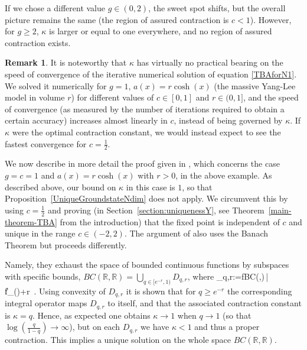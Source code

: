 \documentclass[12pt]{article}
\theoremstyle{plain}
\theoremstyle{definition}
\newtheorem{remark}[theorem]{Remark}
\numberwithin{equation}{section}
\numberwithin{theorem}{section}
\def\be#1\ee{\begin{equation}#1\end{equation}}
\begin{document}
If we chose a different value $g\in(0,2)$, the sweet spot shifts, but the overall picture remains the same (the region of assured contraction is $c<1$). However, for $g\geq 2$, $\kappa$ is larger or equal to one everywhere, and no region of assured contraction exists.

\begin{remark}\label{kappa-is-not-optimal}
It is noteworthy that $\kappa$ has virtually no practical bearing on the speed of convergence of the iterative numerical solution of equation \eqref{TBAforN1}. We solved it numerically for $g=1$, $a(x)=r\cosh(x)$ (the massive Yang-Lee model in volume $r$) for different values of $c\in[0,1]$ and $r\in(0,1]$, and the speed of convergence
(as measured by the number of iterations required to obtain a certain accuracy) increases almost linearly in $c$, instead of being governed by $\kappa$.
If $\kappa$ were the optimal contraction constant, we would instead expect to see the fastest convergence for $c=\tfrac12$.
\end{remark}

We now describe in more detail the proof given in 
\cite[Sec.\,5]{FringKorffSchulz}, which concerns the case $g=c=1$ and $a(x)=r\cosh(x)$ with $r>0$,
in the above example.
As described above, our bound on $\kappa$ in this case is $1$, so that Proposition~\ref{UniqueGroundstateNdim} does not apply. We circumvent this by using $c=\tfrac12$ and proving (in Section~\ref{section:uniquenessY}, see Theorem~\ref{main-theorem-TBA} from the introduction) that the fixed point is independent of $c$ and unique in the range
$c \in (-2,2)$.
The argument of \cite{FringKorffSchulz} also uses the Banach Theorem but proceeds differently.

Namely, they exhaust the space of bounded continuous functions by subspaces with specific bounds, 
	$BC(\mathbb{R},\mathbb{R})=\bigcup_{q \in [e^{-r},1)} D_{q,r}$,
where 
\be
D_{q,r}:=\Big\lbrace f\in BC(,)\,\Big| \left\|f\right\|_\infty \leq \log()+r\Big\rbrace\ .
\ee 
Using convexity of $D_{q,r}$ it is shown that 
	for $q \ge e^{-r}$
the corresponding integral operator maps $D_{q,r}$ to itself, and that the associated contraction constant is $\kappa=q$.
Hence, as expected one obtains $\kappa\rightarrow 1$ when $q\rightarrow 1$ (so that $\log(\tfrac{q}{1-q}) \to \infty$), but on each $D_{q,r}$ we have $\kappa<1$ and thus a proper contraction. This implies a unique solution on the whole space $BC(\mathbb{R},\mathbb{R})$.
\end{document}
